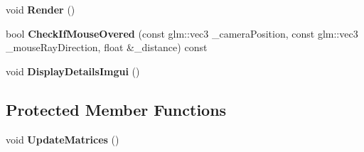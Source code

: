 \begin{DoxyCompactItemize}
void {\bfseries Render} ()
\item 
\mbox{\label{classpiolot_1_1_entity_affee050e5904bd4dff3239804bea6e7e}} 
bool {\bfseries Check\+If\+Mouse\+Overed} (const glm\+::vec3 \+\_\+camera\+Position, const glm\+::vec3 \+\_\+mouse\+Ray\+Direction, float \&\+\_\+distance) const
\item 
\mbox{\label{classpiolot_1_1_entity_acc08eed4d3e1185dfc3fb396720443e5}} 
void {\bfseries Display\+Details\+Imgui} ()
\end{DoxyCompactItemize}
\subsection*{Protected Member Functions}
\begin{DoxyCompactItemize}
\item 
\mbox{\label{classpiolot_1_1_entity_a100b4699f74f506217c4d545f5a81f58}} 
void {\bfseries Update\+Matrices} ()
\end{DoxyCompactItemize}
